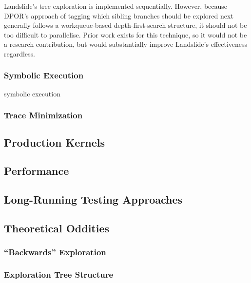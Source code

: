 Landslide's tree exploration is implemented sequentially. However, because DPOR's approach of tagging which sibling branches should be explored next generally follows a workqueue-based depth-first-search structure, it should not be too difficult to parallelise. Prior work exists for this technique\cite{distributed-dpor}, so it would not be a research contribution, but would substantially improve Landslide's effectiveness regardless.

\subsubsection{Symbolic Execution}
symbolic execution\cite{klee,dawson}

\subsubsection{Trace Minimization}

\subsection{Production Kernels}
\label{sec:future-linux}


\subsection{Performance}
\label{sec:future-perf}

\subsection{Long-Running Testing Approaches}
\label{sec:future-shaping}

\subsection{Theoretical Oddities}
\label{sec:future-theory}

\subsubsection{``Backwards'' Exploration}
\label{sec:future-backwards}

\subsubsection{Exploration Tree Structure}
